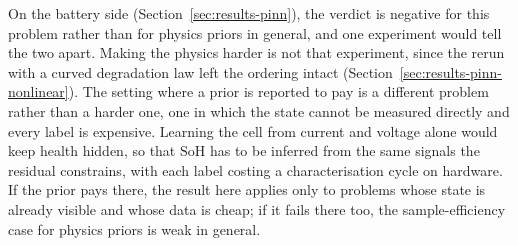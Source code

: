 \documentclass[conference]{IEEEtran}
\begin{document}
On the battery side (Section~\ref{sec:results-pinn}), the verdict is negative for this problem rather than for physics priors in general, and one experiment would tell the two apart. Making the physics harder is not that experiment, since the rerun with a curved degradation law left the ordering intact (Section~\ref{sec:results-pinn-nonlinear}). The setting where a prior is reported to pay is a different problem rather than a harder one, one in which the state cannot be measured directly and every label is expensive. Learning the cell from current and voltage alone would keep health hidden, so that $\mathrm{SoH}$ has to be inferred from the same signals the residual constrains, with each label costing a characterisation cycle on hardware. If the prior pays there, the result here applies only to problems whose state is already visible and whose data is cheap; if it fails there too, the sample-efficiency case for physics priors is weak in general.
\end{document}
